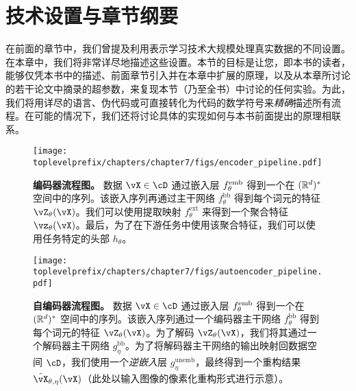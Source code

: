 \documentclass[../../book-main.tex]{subfiles}
\begin{document}
\section{技术设置与章节纲要}\label{sec:experiment_setup}

在前面的章节中，我们曾提及利用表示学习技术大规模处理真实数据的不同设置。在本章中，我们将非常详尽地描述这些设置。本节的目标是让您，即本书的读者，能够仅凭本书中的描述、前面章节引入并在本章中扩展的原理，以及从本章所讨论的若干论文中摘录的超参数，来复现本节（乃至全书）中讨论的任何实验。为此，我们将用详尽的语言、伪代码或可直接转化为代码的数学符号来\textit{精确}描述所有流程。在可能的情况下，我们还将讨论具体的实现如何与本书前面提出的原理相联系。

\begin{figure}
    \texttt{[image: \\toplevelprefix/chapters/chapter7/figs/encoder\_pipeline.pdf]}
    \caption{\small\textbf{编码器流程图。} 数据 \(\vX \in \cD\) 通过嵌入层 \(f_{\theta}^{\mathrm{emb}}\) 得到一个在 \((\mathbb{R}^{d})^{*}\) 空间中的序列。该嵌入序列再通过主干网络 \(f_{\theta}^{\mathrm{bb}}\) 得到每个词元的特征 \(\vZ_{\theta}(\vX)\)。我们可以使用提取映射 \(f_{\theta}^{\mathrm{ext}}\) 来得到一个聚合特征 \(\vz_{\theta}(\vX)\)。最后，为了在下游任务中使用该聚合特征，我们可以使用任务特定的头部 \(h_{\theta}\)。}
    \label{fig:overall_encoder_pipeline}
\end{figure}

\begin{figure}
    \texttt{[image: \\toplevelprefix/chapters/chapter7/figs/autoencoder\_pipeline.pdf]}
    \caption{\small\textbf{自编码器流程图。} 数据 \(\vX \in \cD\) 通过嵌入层 \(f_{\theta}^{\mathrm{emb}}\) 得到一个在 \((\mathbb{R}^{d})^{*}\) 空间中的序列。该嵌入序列通过一个编码器主干网络 \(f_{\theta}^{\mathrm{bb}}\) 得到每个词元的特征 \(\vZ_{\theta}(\vX)\)。为了解码 \(\vZ_{\theta}(\vX)\)，我们将其通过一个解码器主干网络 \(g_{\eta}^{\mathrm{bb}}\)。为了将解码器主干网络的输出映射回数据空间 \(\cD\)，我们使用一个\textit{逆嵌入}层 \(g_{\eta}^{\mathrm{unemb}}\)，最终得到一个重构结果 \(\hat{\vX}_{\theta, \eta}(\vX)\)（此处以输入图像的像素化重构形式进行示意）。}
    \label{fig:overall_autoencoder_pipeline}
\end{figure}
\end{document}
